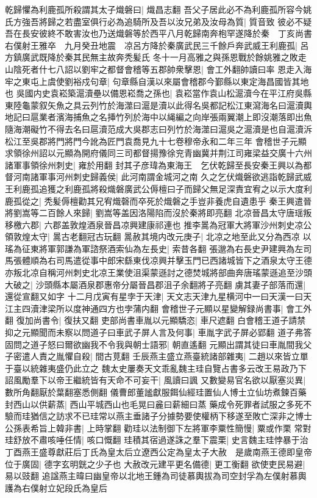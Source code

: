 乾歸懼為利鹿孤所殺謂其太子熾磐曰|{
	熾昌志翻}
吾父子居此必不為利鹿孤所容今姚氏方強吾將歸之若盡室俱行必為追騎所及吾以汝兄弟及汝母為質|{
	質音致}
彼必不疑吾在長安彼終不敢害汝也乃送熾磐等於西平八月乾歸南奔枹罕遂降於秦　丁亥尚書右僕射王雅卒　九月癸丑地震　凉呂方降於秦廣武民三千餘戶奔武威王利鹿孤|{
	呂方鎮廣武既降於秦其民無主故奔秃髪氏}
冬十一月高雅之與孫恩戰於餘姚雅之敗走山陰死者什七八詔以劉牢之都督會稽等五郡帥衆擊恩|{
	會工外翻帥讀曰率}
恩走入海牢之東屯上虞使劉裕戍句章|{
	句章縣自漢以來屬會稽郡今鄞縣以東定海昌國皆其地也}
吳國内史袁崧築滬瀆壘以備恩崧喬之孫也|{
	袁崧當作袁山松滬瀆今在平江府吳縣東陸龜蒙叙矢魚之具云列竹於海澨曰滬是瀆以此得名吳都記松江東瀉海名曰滬瀆輿地記曰扈業者濱海捕魚之名挿竹列於海中以䋲編之向岸張兩翼潮上即沒潮落即出魚隨海潮礙竹不得去名曰扈瀆范成大吳郡志曰列竹於海澨曰滬吳之滬瀆是也自滬瀆泝松江至吳郡將門將門今訛為匠門袁喬見九十七卷穆帝永和二年三年}
會稽世子元顯求領徐州詔以元顯為開府儀同三司都督揚豫徐兖青幽冀并荆江司雍梁益交廣十六州諸軍事領徐州刺史|{
	雍於用翻}
封其子彦瑋為東海王　乞伏乾歸至長安秦王興以為都督河南諸軍事河州刺史歸義侯|{
	此河南謂金城河之南}
久之乞伏熾磐欲逃詣乾歸武威王利鹿孤追獲之利鹿孤將殺熾磐廣武公傉檀曰子而歸父無足深責宜宥之以示大度利鹿孤從之|{
	秃髪傉檀勸其兄宥熾磬而卒死於熾磐之手豈非養虎自遺患乎}
秦王興遣晉將劉嵩等二百餘人來歸|{
	劉嵩等盖因洛陽陷而沒於秦將即亮翻}
北凉晉昌太守唐瑶叛移檄六郡|{
	六郡盖敦煌酒泉晉昌凉興建康祁連也}
推李暠為冠軍大將軍沙州刺史凉公領敦煌太守|{
	暠古老翻冠古玩翻}
暠赦其境内改元庚子|{
	北凉之地至此又分為西凉}
以瑤為征東將軍郭謙為軍諮祭酒索仙為左長史|{
	索昔各翻}
張邈為右長史尹建興為左司馬張體順為右司馬遣從事中郎宋繇東伐凉興并擊玉門已西諸城皆下之酒泉太守王德亦叛北凉自稱河州刺史北凉王業使沮渠蒙遜討之德焚城將部曲奔唐瑤蒙遜追至沙頭大破之|{
	沙頭縣本屬酒泉郡惠帝分屬晉昌郡沮子余翻將子亮翻}
虜其妻子部落而還|{
	還從宣翻又如字}
十二月戊寅有星孛于天津|{
	天文志天津九星横河中一曰天漢一曰天江主四瀆津梁所以度神通四方也孛蒲内翻}
會稽世子元顯以星變解録尚書事|{
	會工外翻}
復加尚書令|{
	復扶又翻}
吏部尚書車胤以元顯驕恣|{
	車尺遮翻}
白會稽王道子請禁抑之元顯聞而未察以問道子曰車武子屏人言及何事|{
	車胤字武子屏必郢翻}
道子弗答固問之道子怒曰爾欲幽我不令我與朝士語邪|{
	朝直遙翻}
元顯出謂其徒曰車胤間我父子密遣人責之胤懼自殺|{
	間古莧翻}
壬辰燕主盛立燕臺統諸部雜夷|{
	二趙以來皆立單于臺以統雜夷盛仍此立之}
魏太史屢奏天文乖亂魏主珪自覽占書多云改王易政乃下詔風勵羣下以帝王繼統皆有天命不可妄干|{
	風讀曰諷}
又數變易官名欲以厭塞災異|{
	數所角翻厭於葉翻塞悉側翻}
儀曹郎董謐獻服餌仙經珪置仙人博士立仙坊煮鍊百藥封西山以供薪蒸|{
	西山平城西山也毛晃曰麄曰薪細曰蒸}
藥成令死罪者試服之多死不驗而珪猶信之訪求不已珪常以燕主垂諸子分據勢要使權柄下移遂至敗亡深非之博士公孫表希旨上韓非書|{
	上時掌翻}
勸珪以法制御下左將軍李粟性簡慢|{
	粟或作栗}
常對珪舒放不肅咳唾任情|{
	咳口慨翻}
珪積其宿過遂誅之羣下震栗|{
	史言魏主珪悖暴于治}
丁酉燕王盛尊獻莊后丁氏為皇太后立遼西公定為皇太子大赦　是歲南燕王德即皇帝位于廣固|{
	德字玄明皝之少子也}
大赦改元建平更名備德|{
	更工衡翻}
欲使吏民易避|{
	易以豉翻}
追諡燕主暐曰幽皇帝以北地王鍾為司徒慕輿拔為司空封孚為左僕射慕輿護為右僕射立妃段氏為皇后

